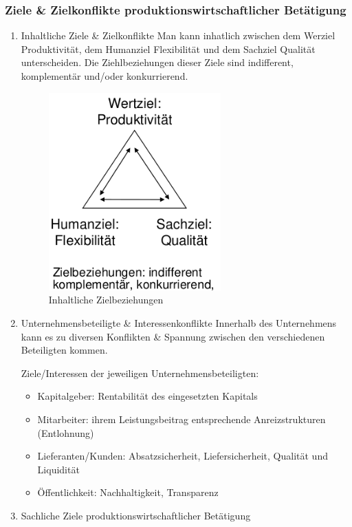 \documentclass[11pt]{article}
\begin{document}
\subsubsection{Ziele \& Zielkonflikte produktionswirtschaftlicher Betätigung}
\label{sec:orgbf63e66}
\begin{enumerate}
\item Inhaltliche Ziele \& Zielkonflikte
\label{sec:org851d0d2}
Man kann inhatlich zwischen dem Werziel Produktivität, dem Humanziel Flexibilität und dem Sachziel Qualität unterscheiden. Die Ziehlbeziehungen dieser Ziele sind indifferent, komplementär und/oder konkurrierend.

\begin{figure}[htbp]
\centering
\includegraphics[width=250px]{./pictures/inhaltziele.png}
\caption{Inhaltliche Zielbeziehungen}
\end{figure} 

\item Unternehmensbeteiligte \& Interessenkonflikte
\label{sec:org0fe2736}
Innerhalb des Unternehmens kann es zu diversen Konflikten \& Spannung zwischen den verschiedenen Beteiligten kommen.

Ziele/Interessen der jeweiligen Unternehmensbeteiligten:
\begin{itemize}
\item Kapitalgeber: Rentabilität des eingesetzten Kapitals
\item Mitarbeiter: ihrem Leistungsbeitrag entsprechende Anreizstrukturen (Entlohnung)
\item Lieferanten/Kunden: Absatzsicherheit, Liefersicherheit, Qualität und Liquidität
\item Öffentlichkeit: Nachhaltigkeit, Transparenz
\end{itemize}

\item Sachliche Ziele produktionswirtschaftlicher Betätigung
\label{sec:org78d8e7e}


\end{enumerate}
\end{document}

